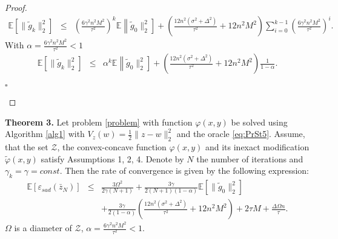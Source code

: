 \documentclass[runningheads]{llncs}
\newcommand{\EndProof}{\begin{flushright}$\square$\end{flushright}}
\begin{document}
\begin{proof}
\begin{eqnarray*}
    \mathbb{E}\left[\|\tilde g_k\|^2_2\right] 
    &\leq& \left(\frac{6\gamma^2 n^2M^2}{\tau^2}\right)^k\mathbb{E}\left\|\tilde g_{0}\|^2_2 \right] + \left(\frac{12n^2 (\sigma^2 + \Delta^2)}{\tau^2}+ 12n^2M^2\right) \sum\limits_{i=0}^{k-1} \left(\frac{6\gamma^2 n^2M^2}{\tau^2}\right)^i. 
\end{eqnarray*}
With $\alpha = \frac{6\gamma^2 n^2M^2}{\tau^2} < 1$
\begin{eqnarray*}
    \mathbb{E}\left[\|\tilde g_k\|^2_2\right] 
    &\leq& \alpha^k\mathbb{E}\left\|\tilde g_{0}\|^2_2 \right] + \left(\frac{12n^2 (\sigma^2 + \Delta^2)}{\tau^2}+ 12n^2M^2\right) \frac{1}{1 - \alpha}. 
\end{eqnarray*}
\EndProof
\end{proof}

\textbf{Theorem 3.}
Let problem \eqref{problem} with function $\varphi(x,y)$ be solved using Algorithm \ref{alg1} with $V_z(w) = \frac{1}{2}\|z-w\|^2_2$ and the oracle \eqref{eq:PrSt5}. Assume, that the set $\mathcal{Z}$, the convex-concave function $\varphi(x,y)$ and its inexact modification $\widetilde{\varphi}(x,y)$ satisfy Assumptions 1, 2, 4. Denote by $N$ the number of iterations and $\gamma_k = \gamma= const$. Then the rate of convergence is given by the following expression:
\begin{eqnarray*}
    \mathbb{E}\left[\varepsilon_{sad}(\bar z_{N})\right] &\leq&
    \frac{3\Omega^2}{2\gamma(N+1)} + \frac{3\gamma}{2(N+1)(1 - \alpha)} \mathbb{E}\left[\|\tilde g_{0}\|^2_2 \right] \nonumber\\
    && + \frac{3\gamma}{2(1 - \alpha)} \left(\frac{12n^2 (\sigma^2 + \Delta^2)}{\tau^2}+ 12n^2M^2\right)  + 2\tau M  + \frac{\Delta \Omega n}{\tau}.
\end{eqnarray*} 
$\Omega$ is a diameter of $\mathcal{Z}$, $\alpha = \frac{6\gamma^2 n^2M^2}{\tau^2} < 1$.
\end{document}
